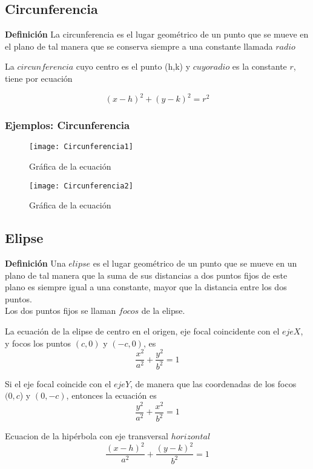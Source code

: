 \documentclass[12pt,a4paper]{article} %
\begin{document}
\newpage

\subsection{Circunferencia} \label{subsec:circunferencia}
\textbf{Definición} La circunferencia es el lugar geométrico de un punto que se mueve en el plano de tal manera que se conserva siempre a una constante llamada $radio$

La $circunferencia$ cuyo centro es el punto (h,k) y $cuyo radio$ es la constante $r$, tiene por ecuación

$${(x - h)^2 + (y - k)^2 = r^2}$$

\subsubsection{Ejemplos: Circunferencia}

\begin{figure}[h]
\centering
\texttt{[image: Circunferencia1]}
\caption{Gráfica de la ecuación }
\label{fig:Circunferencia}
\end{figure}

\begin{figure}[ht]
\centering
\texttt{[image: Circunferencia2]}
\caption{Gráfica de la ecuación }
\label{fig:Circunferencia2}
\end{figure}


\newpage

\subsection{Elipse}
\textbf{Definición} Una $elipse$ es el lugar geométrico de un punto que se mueve en un plano de tal manera que la suma de sus distancias a dos puntos fijos de este plano es siempre igual a una constante, mayor que la distancia entre los dos puntos.
\\Los dos puntos fijos se llaman $focos$ de la elipse. 


La ecuación de la elipse de centro en el origen, eje focal coincidente con el $eje X$, y focos los puntos $(c,0)$ y $(-c,0)$, es
$$ {\frac{x^2}{a^2} + \frac{y^2}{b^2} = 1} $$

Si el eje focal coincide con el $eje Y$, de manera que las coordenadas de los focos $(0,c$) y $(0,-c)$, entonces la ecuación es 
$$ {\frac{y^2}{a^2} + \frac{x^2}{b^2} = 1} $$

Ecuacion de la hipérbola con eje transversal $horizontal$
$$ {\frac{(x - h)^2}{a^2} + \frac{(y - k)^2}{b^2} = 1} $$
\end{document}
